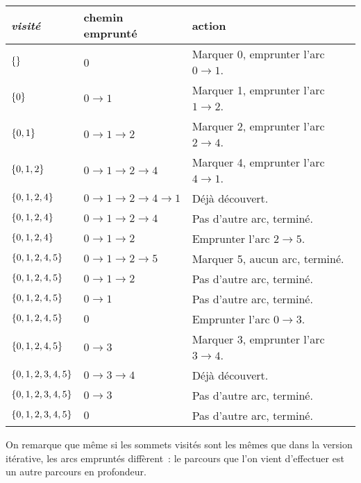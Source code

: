 \documentclass{magnolia}
\begin{document}
\begin{center}
\begin{tabular}{l|l|l}
\emph{visité} & chemin emprunté & action\\
\hline
$\left\{\right\}$ &0 &  Marquer 0, emprunter l'arc $0\to 1$.\\
$\left\{0\right\}$ &$0 \to 1$ & Marquer 1, emprunter l'arc $1\to 2$.\\ 
$\left\{0,1\right\}$ &$0 \to 1 \to 2$ & Marquer 2, emprunter l'arc $2\to 4$.\\
$\left\{0, 1, 2\right\}$ &$0 \to 1 \to 2 \to 4$ & Marquer 4, emprunter l'arc $4\to 1$.\\
$\left\{0, 1, 2, 4\right\}$ &$0 \to 1 \to 2 \to 4 \to 1$ & Déjà découvert.\\
$\left\{0,1,2,4\right\}$ &$0 \to 1 \to 2 \to 4$ & Pas d'autre arc, terminé.\\
$\left\{0,1,2,4\right\}$ &$0 \to 1 \to 2$ & Emprunter l'arc $2\to 5$.\\
$\left\{0,1,2,4,5\right\}$ &$0 \to 1 \to 2 \to 5$ & Marquer 5, aucun arc, terminé.\\
$\left\{0,1,2,4,5\right\}$ &$0 \to 1 \to 2$ & Pas d'autre arc, terminé.\\
$\left\{0,1,2,4,5\right\}$ &$0 \to 1$ & Pas d'autre arc, terminé.\\
$\left\{0,1,2,4,5\right\}$ &$0$ & Emprunter l'arc $0\to 3$.\\ 
$\left\{0,1,2,4,5\right\}$ &$0 \to 3$ & Marquer 3, emprunter l'arc $3\to 4$.\\
$\left\{0,1,2,3,4,5\right\}$ & $0 \to 3 \to 4$ & Déjà découvert.\\
$\left\{0,1,2,3,4,5\right\}$ & $0 \to 3$ & Pas d'autre arc, terminé.\\
$\left\{0,1,2,3,4,5\right\}$ & $0$ & Pas d'autre arc, terminé.
\end{tabular}
\end{center}
\noindent
\noindent
On remarque que même si les sommets visités sont les mêmes que dans la version itérative,
les arcs empruntés diffèrent~: le parcours que l'on vient
d'effectuer est un autre parcours en profondeur.
\end{document}
